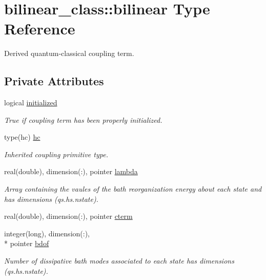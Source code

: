 \hypertarget{structbilinear__class_1_1bilinear}{\section{bilinear\+\_\+class\+:\+:bilinear Type Reference}
\label{structbilinear__class_1_1bilinear}
}


Derived quantum-\/classical coupling term.  


\subsection*{Private Attributes}
\begin{DoxyCompactItemize}
\item 
logical \hyperlink{structbilinear__class_1_1bilinear_a97bca767cbc1ecae9489db5950da06bc}{initialized}
\begin{DoxyCompactList}\small\item\em True if coupling term has been properly initialized. \end{DoxyCompactList}\item 
type(hc) \hyperlink{structbilinear__class_1_1bilinear_aeb9f98e320b690f4bfef83caf407dfaa}{hc}
\begin{DoxyCompactList}\small\item\em Inherited coupling primitive type. \end{DoxyCompactList}\item 
real(double), dimension(\+:), pointer \hyperlink{structbilinear__class_1_1bilinear_aabd615d49d52220aac52707b2e2b1aa6}{lambda}
\begin{DoxyCompactList}\small\item\em Array containing the vaules of the bath reorganization energy about each state and has dimensions (qs.\+hs.\+nstate). \end{DoxyCompactList}\item 
real(double), dimension(\+:), pointer \hyperlink{structbilinear__class_1_1bilinear_a2ef21bf96002e18fe9aa3c9edfcca3ed}{cterm}
\item 
integer(long), dimension(\+:), \\*
pointer \hyperlink{structbilinear__class_1_1bilinear_a78e65d82cd358d5dfa19b780ab877fa0}{bdof}
\begin{DoxyCompactList}\small\item\em Number of dissipative bath modes associated to each state has dimensions (qs.\+hs.\+nstate). \end{DoxyCompactList}\item 

\end{DoxyCompactItemize}
